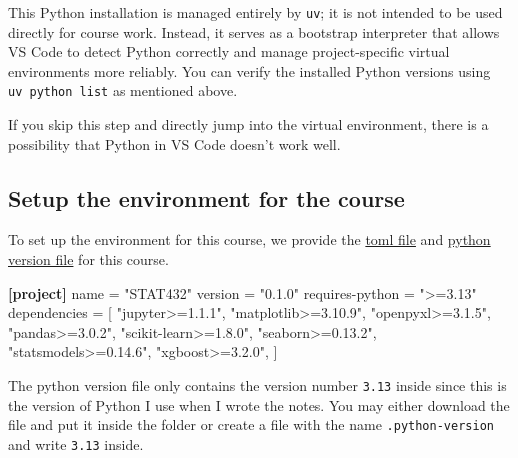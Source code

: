 \documentclass[
  letterpaper,
  DIV=11,
  numbers=noendperiod]{scrreprt}
\newenvironment{Shaded}{\begin{snugshade}}{\end{snugshade}}
\newcommand{\DataTypeTok}[1]{\textcolor[rgb]{0.68,0.00,0.00}{#1}}
\newcommand{\KeywordTok}[1]{\textcolor[rgb]{0.00,0.23,0.31}{\textbf{#1}}}
\newcommand{\OperatorTok}[1]{\textcolor[rgb]{0.37,0.37,0.37}{#1}}
\newcommand{\StringTok}[1]{\textcolor[rgb]{0.13,0.47,0.30}{#1}}
\theoremstyle{definition}
\theoremstyle{definition}
\theoremstyle{plain}
\theoremstyle{plain}
\theoremstyle{remark}
\begin{document}
This Python installation is managed entirely by \texttt{uv}; it is not
intended to be used directly for course work. Instead, it serves as a
bootstrap interpreter that allows VS Code to detect Python correctly and
manage project-specific virtual environments more reliably. You can
verify the installed Python versions using \texttt{uv\ python\ list} as
mentioned above.

If you skip this step and directly jump into the virtual environment,
there is a possibility that Python in VS Code doesn't work well.

\subsection{Setup the environment for the
course}\label{setup-the-environment-for-the-course}

To set up the environment for this course, we provide the
\href{../../pyproject.toml}{toml file} and
\href{../../.python-version}{python version file} for this course.

\begin{Shaded}
\begin{Highlighting}[]
\KeywordTok{[project]}
\DataTypeTok{name} \OperatorTok{=} \StringTok{"STAT432"}
\DataTypeTok{version} \OperatorTok{=} \StringTok{"0.1.0"}
\DataTypeTok{requires{-}python} \OperatorTok{=} \StringTok{"\textgreater{}=3.13"}
\DataTypeTok{dependencies} \OperatorTok{=} \OperatorTok{[}
    \StringTok{"jupyter\textgreater{}=1.1.1"}\OperatorTok{,}
    \StringTok{"matplotlib\textgreater{}=3.10.9"}\OperatorTok{,}
    \StringTok{"openpyxl\textgreater{}=3.1.5"}\OperatorTok{,}
    \StringTok{"pandas\textgreater{}=3.0.2"}\OperatorTok{,}
    \StringTok{"scikit{-}learn\textgreater{}=1.8.0"}\OperatorTok{,}
    \StringTok{"seaborn\textgreater{}=0.13.2"}\OperatorTok{,}
    \StringTok{"statsmodels\textgreater{}=0.14.6"}\OperatorTok{,}
    \StringTok{"xgboost\textgreater{}=3.2.0"}\OperatorTok{,}
\OperatorTok{]}
\end{Highlighting}
\end{Shaded}

The python version file only contains the version number \texttt{3.13}
inside since this is the version of Python I use when I wrote the notes.
You may either download the file and put it inside the folder or create
a file with the name \texttt{.python-version} and write \texttt{3.13}
inside.
\end{document}
